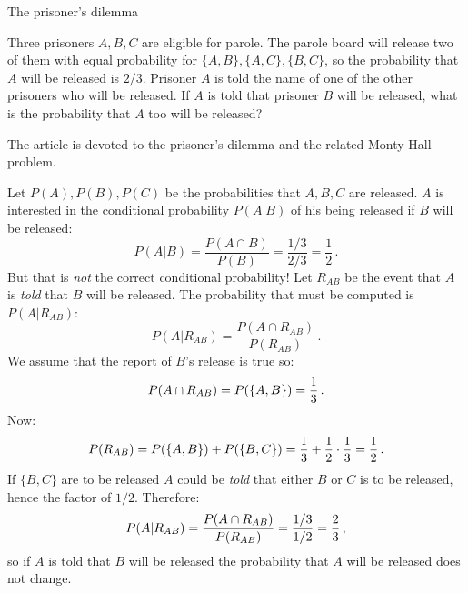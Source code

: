 





\begin{prob}{The prisoner's dilemma}

Three prisoners $A,B,C$ are eligible for parole. The parole board will release two of them with equal probability for $\{A,B\}, \{A,C\}, \{B,C\}$, so the probability that $A$ will be released is $2/3$. Prisoner $A$ is told the name of one of the other prisoners who will be released. If $A$ is told that prisoner $B$ will be released, what is the probability that $A$ too will be released?

The article \cite{carlton} is devoted to the prisoner's dilemma and the related Monty Hall problem.
\end{prob}


Let $P(A), P(B), P(C)$ be the probabilities that $A,B,C$ are released. $A$ is interested in the conditional probability $P(A|B)$ of his being released if $B$ will be released:
\[
P(A|B) = \frac{P(A\cap B)}{P(B)} = \frac{1/3}{2/3}=\frac{1}{2}\,.
\]
But that is \emph{not} the correct conditional probability! Let $R_{AB}$ be the event that $A$ is \emph{told} that $B$ will be released. The probability that must be computed is $P(A|R_{AB})$:
\[
P(A|R_{AB}) = \frac{P(A\cap R_{AB})}{P(R_{AB})}\,.
\]
We assume that the report of $B$'s release is true so:
\[
P(A\cap R_{AB})=P(\{A,B\})=\displaystyle\frac{1}{3}\,.
\]
Now:
\[
P(R_{AB})=P(\{A,B\})+P(\{B,C\})=\displaystyle\frac{1}{3}+\displaystyle\frac{1}{2}\cdot \displaystyle\frac{1}{3}=\displaystyle\frac{1}{2}\,.
\]
If $\{B,C\}$ are to be released $A$ could be \emph{told} that either $B$ or $C$ is to be released, hence the factor of $1/2$. Therefore:
\[
P(A|R_{AB}) = \frac{P(A\cap R_{AB})}{P(R_{AB})} = \displaystyle\frac{1/3}{1/2}=\displaystyle\frac{2}{3}\,,
\]
so if $A$ is told that $B$ will be released the probability that $A$ will be released does not change.



